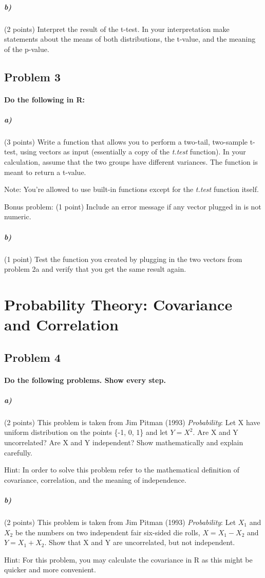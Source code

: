 \documentclass[12pt,letter]{article}
\begin{document}
\subparagraph{b)} (2 points) Interpret the result of the t-test. In your interpretation make statements about the means of both distributions, the t-value, and the meaning of the p-value.



\subsection*{Problem 3}

\paragraph{Do the following in R:}

\subparagraph{a)} (3 points) Write a function that allows you to perform a two-tail, two-sample t-test, using vectors as input (essentially a copy of the \textit{t.test} function). In your calculation, assume that the two groups have different variances. The function is meant to return a t-value.

Note: You're allowed to use built-in functions except for the \textit{t.test} function itself.

\bigskip

Bonus problem: (1 point) Include an error message if any vector plugged in is not numeric.

\subparagraph{b)} (1 point) Test the function you created by plugging in the two vectors from problem 2a and verify that you get the same result again.





\section*{Probability Theory: Covariance and Correlation}

\subsection*{Problem 4}

\paragraph{Do the following problems. Show every step.}

\subparagraph{a)} (2 points) This problem is taken from Jim Pitman (1993) \textit{Probability}: Let X have uniform distribution on the points \big\{-1, 0, 1\big\} and let $Y=X^2$. Are X and Y uncorrelated? Are X and Y independent? Show mathematically and explain carefully. %

Hint: In order to solve this problem refer to the mathematical definition of covariance, correlation, and the meaning of independence.

\subparagraph{b)} (2 points) This problem is taken from Jim Pitman (1993) \textit{Probability}: Let $X_{1}$ and $X_{2} $ be the numbers on two independent fair six-sided die rolls, $X = X_{1} - X_{2}$ and $Y= X_{1} + X_{2}$. Show that X and Y are uncorrelated, but not independent. %

Hint: For this problem, you may calculate the covariance in R as this might be quicker and more convenient.
\end{document}
